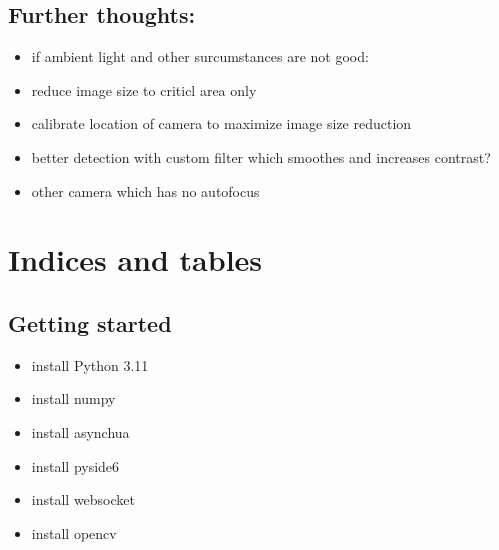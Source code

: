 \documentclass[letterpaper,10pt,english]{sphinxmanual}
\begin{document}
\section{Further thoughts:}
\label{\detokenize{index:further-thoughts}}\begin{itemize}
\item {} 
\sphinxAtStartPar
if ambient light and other surcumstances are not good:

\item {} 
\sphinxAtStartPar
reduce image size to criticl area only

\item {} 
\sphinxAtStartPar
calibrate location of camera to maximize image size reduction

\item {} 
\sphinxAtStartPar
better detection with custom filter which smoothes and increases contrast?

\item {} 
\sphinxAtStartPar
other camera which has no autofocus

\end{itemize}


\chapter{Indices and tables}
\label{\detokenize{index:indices-and-tables}}

\section{Getting started}
\label{\detokenize{index:getting-started}}\begin{itemize}
\item {} 
\sphinxAtStartPar
install Python 3.11

\item {} 
\sphinxAtStartPar
install numpy

\item {} 
\sphinxAtStartPar
install asynchua

\item {} 
\sphinxAtStartPar
install pyside6

\item {} 
\sphinxAtStartPar
install websocket

\item {} 
\sphinxAtStartPar
install opencv

\end{itemize}
\end{document}
